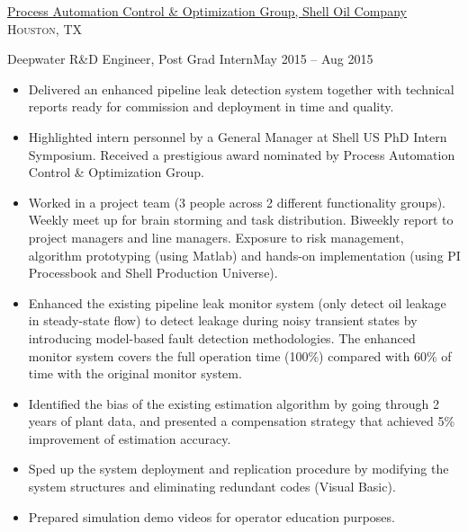 \documentclass[10pt,a4paper]{article}
\begin{document}
  \headedsection
  {\href{http://sites.psu.edu/jinyuxie/internship-project/}{Process Automation Control \& Optimization Group, Shell Oil Company}}
  {\textsc{Houston, TX}}
  {
    \headedsubsection
    {Deepwater R\&D Engineer, Post Grad Intern}{May 2015 -- Aug 2015}
    {
      \begin{itemize}
      \item Delivered an enhanced pipeline leak detection system together with
        technical reports ready for commission and deployment in time and
        quality.
        
      \item Highlighted intern personnel by a General Manager at Shell US PhD
        Intern Symposium. Received a prestigious award nominated by Process
        Automation Control \& Optimization Group. 
        
      \item Worked in a project team (3 people across 2 different functionality
        groups). Weekly meet up for brain storming and task distribution. Biweekly
        report to project managers and line managers. Exposure to risk management,
        algorithm prototyping (using Matlab) and hands-on implementation (using PI
        Processbook and Shell Production Universe).
        
      \item Enhanced the existing pipeline leak monitor system (only detect
        oil leakage in steady-state flow) to detect leakage during noisy
        transient states by introducing model-based fault detection
        methodologies. The enhanced monitor system covers the full operation time
        (100\%) compared with 60\% of time with the original monitor system.  
        
      \item Identified the bias of the existing estimation algorithm by going
        through 2 years of plant data, and presented a compensation strategy that
        achieved 5\% improvement of estimation accuracy.
        
      \item Sped up the system deployment and replication procedure by modifying the system
        structures and eliminating redundant codes (Visual Basic).
        
      \item Prepared simulation demo videos for operator education purposes.
      \end{itemize}
    }
  }
\end{document}
